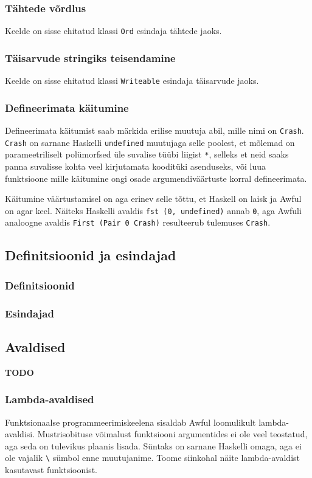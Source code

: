 \documentclass[12pt]{article}
\newcommand\markus[1]{\textcolor{roheline}{\textbf{#1}}}
\begin{document}
      \subsubsection{Tähtede võrdlus}
        Keelde on sisse ehitatud klassi \verb!Ord! esindaja tähtede jaoks.
      \subsubsection{Täisarvude stringiks teisendamine}
        Keelde on sisse ehitatud klassi \verb!Writeable! esindaja täisarvude jaoks.
      \subsubsection{Defineerimata käitumine}
        Defineerimata käitumist saab märkida erilise muutuja abil, mille nimi on \verb!Crash!. \verb!Crash! on sarnane Haskelli \verb!undefined! muutujaga selle poolest, et mõlemad on parameetriliselt polümorfsed üle suvalise tüübi liigist \verb!*!, selleks et neid saaks panna suvalisse kohta veel kirjutamata kooditüki asenduseks, või luua funktsioone mille käitumine ongi osade argumendiväärtuste korral defineerimata.

        Käitumine väärtustamisel on aga erinev selle tõttu, et Haskell on laisk ja Awful on agar keel. Näiteks Haskelli avaldis \verb!fst (0, undefined)! annab \verb!0!, aga Awfuli analoogne avaldis \verb!First (Pair 0 Crash)! resulteerub tulemuses \verb!Crash!.
    \subsection{Definitsioonid ja esindajad}
      
      \subsubsection{Definitsioonid}
        
      \subsubsection{Esindajad}
        
    \subsection{Avaldised}
      \markus{TODO}
      \subsubsection{Lambda-avaldised}
        Funktsionaalse programmeerimiskeelena sisaldab Awful loomulikult lambda-avaldisi. Mustrisobituse võimalust funktsiooni argumentides ei ole veel teostatud, aga seda on tulevikus plaanis lisada. Süntaks on sarnane Haskelli omaga, aga ei ole vajalik \verb!\! sümbol enne muutujanime. Toome siinkohal näite lambda-avaldist kasutavast funktsioonist.
\end{document}
